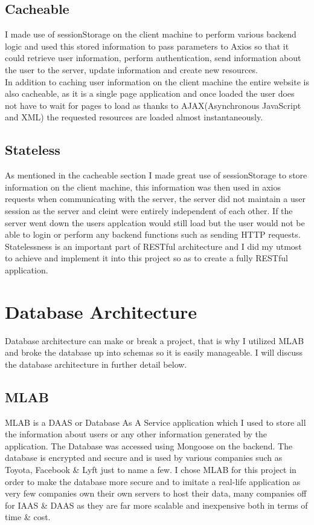 \subsection{Cacheable}
I made use of sessionStorage on the client machine to perform various backend logic and
used this stored information to pass parameters to Axios so that it could retrieve user information,
perform authentication, send information about the user to the server, update information and create new resources.
\\
In addition to caching user information on the client machine the entire website is also cacheable, as it is a single page
application and once loaded the user does not have to wait for pages to load as thanks to AJAX(Asynchronous JavaScript and XML)
the requested resources are loaded almost instantaneously.
\subsection{Stateless}
As mentioned in the cacheable section I made great use of sessionStorage to store information on the client machine, this information was then used in axios requests when communicating with the server, the server did not maintain a user session as the server and cleint were entirely independent of each other.  If the server went down the users applcation would still load but the user would not be able to login or perform any backend functions such as sending HTTP requests.  Statelessness is an important part of RESTful architecture and I did my utmost to achieve and implement it into this project so as to create a fully RESTful application.
\section{Database Architecture}
Database architecture can make or break a project, that is why I utilized MLAB and broke the database up into schemas so it is easily manageable.  I will discuss the database architecture in further detail below.
\subsection{MLAB}
MLAB is a DAAS or Database As A Service application which I used to store all the information about users or any other information
generated by the application.  The Database was accessed using Mongoose on the backend.  The database is encrypted and secure and is used by
various companies such as Toyota, Facebook \& Lyft just to name a few.  I chose MLAB for this project in order to make the database more secure
and to imitate a real-life application as very few companies own their own servers to host their data, many companies off for IAAS \& DAAS as they are far more scalable and inexpensive both in terms of time \& cost.
